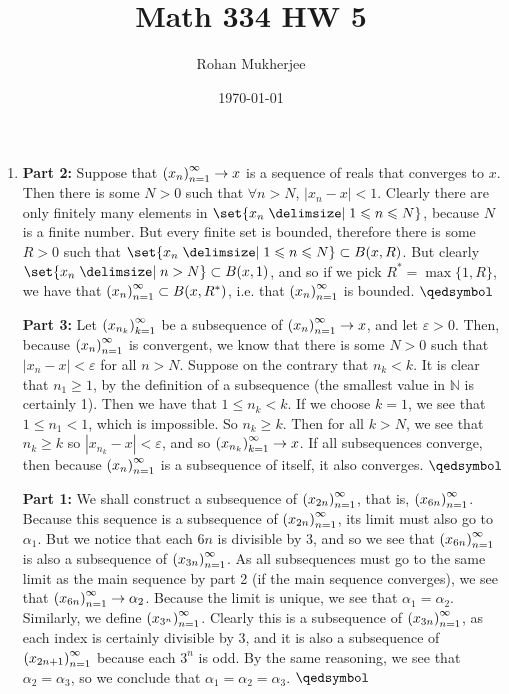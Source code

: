 \documentclass[12pt]{article}
\title{Math 334 HW 5}
\date{\today}
\author{Rohan Mukherjee}
\def\mbb#1{\mathbb{#1}}
\def\bN{\mbb{N}}
\theoremstyle{definition}
\theoremstyle{remark}
\newcommand{\ve}{\varepsilon}
\renewcommand{\qed}{\hfill\qedsymbol}
\newcommand{\seq}[2]{\qty(#1_#2)_{#2=1}^{\infty}}
\renewcommand{\geq}{\geqslant}
\renewcommand{\leq}{\leqslant}
\begin{document}
	\maketitle
	\begin{enumerate}[leftmargin=\labelsep]
		\item 
		\textbf{Part 2:} Suppose that $\seq{x}{n} \to x$ is a sequence of reals that converges to $x$. Then there is some $N > 0$ such that $\forall n > N$, $|x_n-x| < 1$. Clearly there are only finitely many elements in $\set{x_n \given 1 \leq n \leq N}$, because $N$ is a finite number. But every finite set is bounded, therefore there is some $R > 0$ such that $\set{x_n \given 1 \leq n \leq N} \subset B(x, R)$. But clearly $\set{x_n \given n > N} \subset B(x, 1)$, and so if we pick $R^* = \max\{1, R\}$, we have that $\seq{x}{n} \subset B(x, R^*)$, i.e. that $\seq{x}{n}$ is bounded. $\qed$
		
		\textbf{Part 3:} Let $\qty(x_{n_k})_{k=1}^{\infty}$ be a subsequence of $\seq{x}{n} \to x$, and let $\ve > 0$. Then, because $\seq{x}{n}$ is convergent, we know that there is some $N > 0$ such that $|x_n-x| < \ve$ for all $n > N$. Suppose on the contrary that $n_k < k$. It is clear that $n_1 \geq 1$, by the definition of a subsequence (the smallest value in $\bN$ is certainly 1). Then we have that $1 \leq n_k < k$. If we choose $k=1$, we see that $1 \leq n_1 < 1$, which is impossible. So $n_k \geq k$. Then for all $k > N$, we see that $n_k \geq k$ so $|x_{n_k} - x| < \ve$, and so $\qty(x_{n_k})_{k=1}^{\infty} \to x$. If all subsequences converge, then because $\seq{x}{n}$ is a subsequence of itself, it also converges. $\qed$
		
		\textbf{Part 1:}  We shall construct a subsequence of $\qty(x_{2n})_{n=1}^{\infty}$, that is, $\qty(x_{6n})_{n=1}^{\infty}$. Because this sequence is a subsequence of $\qty(x_{2n})_{n=1}^{\infty}$, its limit must also go to $\alpha_1$. But we notice that each $6n$ is divisible by 3, and so we see that $\qty(x_{6n})_{n=1}^{\infty}$ is also a subsequence of $\qty(x_{3n})_{n=1}^{\infty}$. As all subsequences must go to the same limit as the main sequence by part 2 (if the main sequence converges), we see that $\qty(x_{6n})_{n=1}^{\infty} \to \alpha_2$. Because the limit is unique, we see that $\alpha_1 = \alpha_2$. Similarly, we define $\qty(x_{3^n})_{n=1}^{\infty}$. Clearly this is a subsequence of $\qty(x_{3n})_{n=1}^{\infty}$, as each index is certainly divisible by 3, and it is also a subsequence of $\qty(x_{2n+1})_{n=1}^{\infty}$ because each $3^n$ is odd. By the same reasoning, we see that $\alpha_2 = \alpha_3$, so we conclude that $\alpha_1=\alpha_2=\alpha_3$. $\qed$
		

\end{enumerate}
\end{document}
